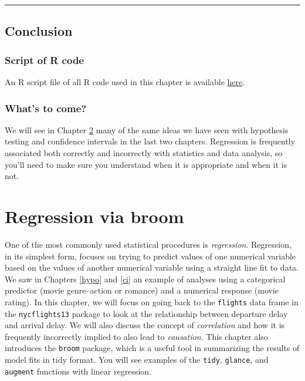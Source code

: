 \documentclass[]{tufte-book}
\let\oldrule=\rule
\renewcommand{\rule}[1]{\oldrule{\linewidth}}
\begin{document}
\begin{center}\rule{0.5\linewidth}{\linethickness}\end{center}

\section{Conclusion}\label{conclusion-4}

\subsection{Script of R code}\label{script-of-r-code-4}

An R script file of all R code used in this chapter is available
\href{http://ismayc.github.io/moderndiver-book/scripts/08-ci.R}{here}.

\subsection{What's to come?}\label{whats-to-come-5}

We will see in Chapter \ref{regress} many of the same ideas we have seen
with hypothesis testing and confidence intervals in the last two
chapters. Regression is frequently associated both correctly and
incorrectly with statistics and data analysis, so you'll need to make
sure you understand when it is appropriate and when it is not.

\chapter{Regression via broom}\label{regress}

One of the most commonly used statistical procedures is
\emph{regression}. Regression, in its simplest form, focuses on trying
to predict values of one numerical variable based on the values of
another numerical variable using a straight line fit to data. We saw in
Chapters \ref{hypo} and \ref{ci} an example of analyses using a
categorical predictor (movie genre--action or romance) and a numerical
response (movie rating). In this chapter, we will focus on going back to
the \texttt{flights} data frame in the \texttt{nycflights13} package to
look at the relationship between departure delay and arrival delay. We
will also discuss the concept of \emph{correlation} and how it is
frequently incorrectly implied to also lead to \emph{causation}. This
chapter also introduces the \texttt{broom} package, which is a useful
tool in summarizing the results of model fits in tidy format. You will
see examples of the \texttt{tidy}, \texttt{glance}, and \texttt{augment}
functions with linear regression.
\end{document}

